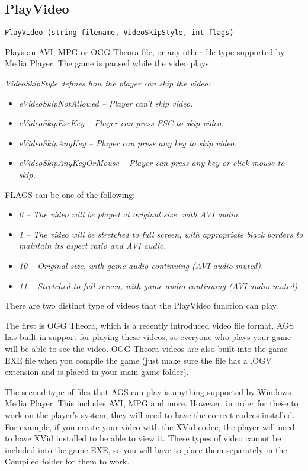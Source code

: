 \subsection{PlayVideo}\label{PlayVideo}%

\begin{verbatim}
PlayVideo (string filename, VideoSkipStyle, int flags)
\end{verbatim}
Plays an AVI, MPG or OGG Theora file, or any other file type supported by Media Player.
The game is paused while the video plays.

\it{VideoSkipStyle} defines how the player can skip the video:
\begin{itemize}
\item \it{eVideoSkipNotAllowed} -- Player can't skip video.
\item \it{eVideoSkipEscKey} -- Player can press ESC to skip video.
\item \it{eVideoSkipAnyKey} -- Player can press any key to skip video.
\item \it{eVideoSkipAnyKeyOrMouse} -- Player can press any key or click mouse to skip.
\end{itemize}

FLAGS can be one of the following:
\begin{itemize}
\item \it{0} -- The video will be played at original size, with AVI audio.
\item \it{1} -- The video will be stretched to full screen, with appropriate
   black borders to maintain its aspect ratio and AVI audio.
\item \it{10} -- Original size, with game audio continuing (AVI audio muted).
\item \it{11} -- Stretched to full screen, with game audio continuing (AVI audio muted).
\end{itemize}

There are two distinct type of videos that the PlayVideo function can play.

The first is OGG Theora, which is a recently introduced video file format. AGS
has built-in support for playing these videos, so everyone who plays your game
will be able to see the video. OGG Theora videos are also built into the game EXE
file when you compile the game (just make sure the file has a .OGV extension and
is placed in your main game folder).

The second type of files that AGS can play is anything supported by Windows Media
Player. This includes AVI, MPG and more. However, in order for these to work on
the player's system, they will need to have the correct codecs installed. For example,
if you create your video with the XVid codec, the player will need to have XVid installed
to be able to view it. These types of video cannot be included into the game EXE,
so you will have to place them separately in the Compiled folder for them to work.


